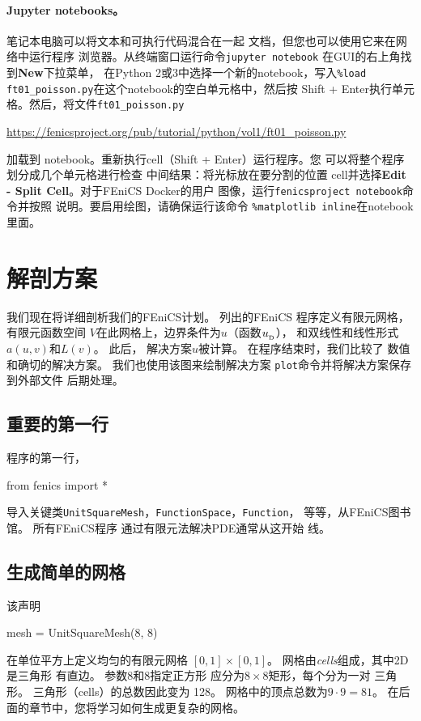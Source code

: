 \paragraph{Jupyter notebooks。}

笔记本电脑可以将文本和可执行代码混合在一起
文档，但您也可以使用它来在网络中运行程序
浏览器。从终端窗口运行命令\texttt{jupyter notebook}
在GUI的右上角找到\textbf{New}下拉菜单，
在Python 2或3中选择一个新的notebook，写入\verb!%load ft01_poisson.py!在这个notebook的空白单元格中，然后按
Shift + Enter执行单元格。然后，将文件\nolinkurl{ft01_poisson.py}
\begin{center}
  \url{https://fenicsproject.org/pub/tutorial/python/vol1/ft01_poisson.py}
\end{center}
加载到
notebook。重新执行cell（Shift + Enter）运行程序。您
可以将整个程序划分成几个单元格进行检查
中间结果：将光标放在要分割的位置
cell并选择\textbf{Edit - Split Cell}。对于FEniCS Docker的用户
图像，运行\texttt{fenicsproject notebook}命令并按照
说明。要启用绘图，请确保运行该命令
\verb!%matplotlib inline!在notebook里面。

\section{解剖方案}
\label{ch:poisson0:impl:dissect}
我们现在将详细剖析我们的FEniCS计划。 列出的FEniCS
程序定义有限元网格，有限元函数空间
$V$在此网格上，边界条件为$u$（函数$\ub$），
和双线性和线性形式$a(u,v)$和$L(v)$。 此后，
解决方案$u$被计算。 在程序结束时，我们比较了
数值和确切的解决方案。 我们也使用该图来绘制解决方案
\texttt{plot}命令并将解决方案保存到外部文件
后期处理。

\subsection{重要的第一行}
程序的第一行，
\begin{python}
from fenics import *
\end{python}
导入关键类\texttt{UnitSquareMesh}，\texttt{FunctionSpace}，\texttt{Function}，
等等，从FEniCS图书馆。 所有FEniCS程序
通过有限元法解决PDE通常从这开始
线。


\subsection{生成简单的网格}
该声明
\begin{python}
mesh = UnitSquareMesh(8, 8)
\end{python}
在单位平方上定义均匀的有限元网格
$[0,1]\times [0,1]$。 网格由\emph{cells}组成，其中2D是三角形
有直边。 参数8和8指定正方形
应分为$8\times 8$矩形，每个分为一对
三角形。 三角形（cells）的总数因此变为
128。 网格中的顶点总数为$9\cdot 9=81$。
在后面的章节中，您将学习如何生成更复杂的网格。

